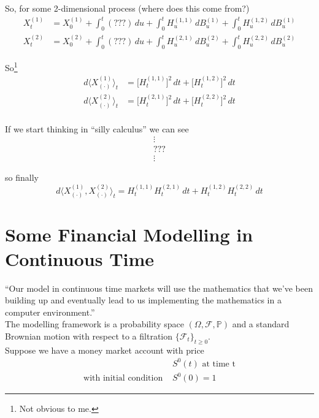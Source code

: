 \documentclass[12pt]{article}
\newlength\tindent
\renewcommand{\indent}{\hspace*{\tindent}}
\begin{document}
So, for some 2-dimensional process (where does this come from?)
\begin{align*}
	X^{(1)}_t &= X^{(1)}_0 + \int^t_0 (\text{???})\,du + \int^t_0 H^{(1,1)}_u\,dB^{(1)}_u + \int^t_0 H^{(1,2)}_u\,dB^{(1)}_u \\
	X^{(2)}_t &= X^{(2)}_0 + \int^t_0 (\text{???})\,du + \int^t_0 H^{(2,1)}_u\,dB^{(2)}_u + \int^t_0 H^{(2,2)}_u\,dB^{(2)}_u
\end{align*}

So\footnote{Not obvious to me.}
\begin{align*}
	d\langle X^{(1)}_{(\cdot)}\rangle_t &= \big[H^{(1,1)}_t \big]^2\,dt + \big[H^{(1,2)}_t \big]^2\,dt \\
	d\langle X^{(2)}_{(\cdot)}\rangle_t &= \big[H^{(2,1)}_t \big]^2\,dt + \big[H^{(2,2)}_t \big]^2\,dt \\
\end{align*}

If we start thinking in ``silly calculus'' we can see
\begin{gather*}
	\vdots \\
	\text{???} \\
	\vdots
\end{gather*}

so finally
\begin{equation*}
	d\langle X^{(1)}_{(\cdot)},X^{(2)}_{(\cdot)}\rangle_t = H^{(1,1)}_tH^{(2,1)}_t\,dt + H^{(1,2)}_tH^{(2,2)}_t\,dt
\end{equation*}


\section{Some Financial Modelling in Continuous Time}

\indent ``Our model in continuous time markets will use the mathematics that we've been building up and eventually lead to us implementing the mathematics in a computer environment.'' \\

\indent The modelling framework is a probability space $(\Omega,\mathcal F,\mathbb P)$ and a standard Brownian motion with respect to a filtration $\{\mathcal F_t\}_{t\geq0}$. \\

Suppose we have a money market account with price
\begin{align*}
	&S^0(t) \text{ at time t} \\
    	\text{with initial condition } &S^0(0) = 1
\end{align*}
\end{document}
